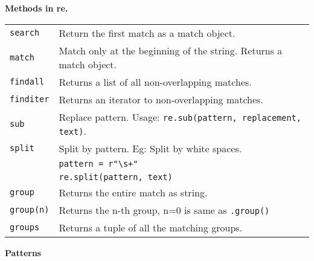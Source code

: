 \textbf{Methods in re.}\\
\begin{tabularx}{\linewidth}{lX}
    \texttt{search}         & Return the first match as a match object.\\
    \texttt{match}          & Match only at the beginning of the string. Returns a match object.\\
    \texttt{findall}        & Returns a list of all non-overlapping matches.\\
    \texttt{finditer}       & Returns an iterator to non-overlapping matches.\\
    \texttt{sub}            & Replace pattern. Usage: \texttt{re.sub(pattern, replacement, text)}.\\
    \texttt{split}          & Split by pattern. Eg: Split by white spaces.\\
                            & \texttt{pattern = r"\textbackslash s+"}\\
                            & \texttt{re.split(pattern, text)}\\
    \texttt{group}          & Returns the entire match as string.\\
    \texttt{group(n)}       & Returns the n-th group, n=0 is same as \texttt{.group()}\\
    \texttt{groups}         & Returns a tuple of all the matching groups.\\
\end{tabularx}

\textbf{Patterns}

